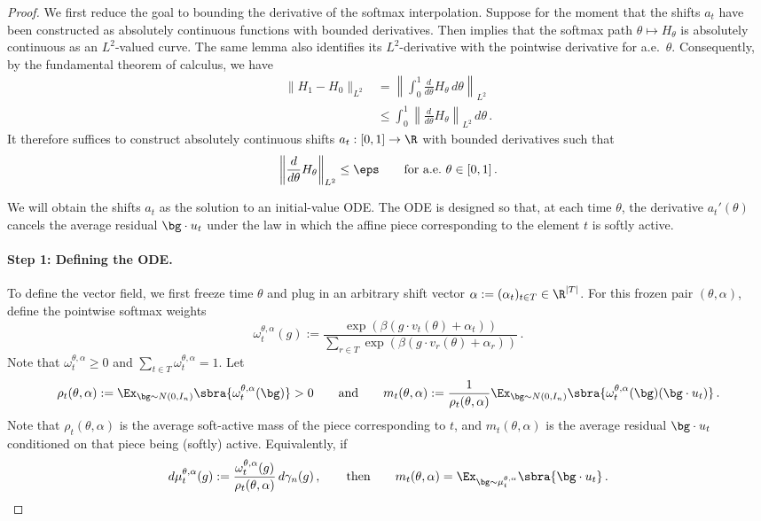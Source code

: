 \documentclass[11pt]{article}
\begin{document}
\begin{proof}
	We first reduce the goal to bounding the derivative of the softmax interpolation. 
	Suppose for the moment that the shifts $a_t$ have been constructed as absolutely continuous functions with bounded derivatives.
	Then  implies that the softmax path $\theta\mapsto H_\theta$ is absolutely continuous as an $L^2$-valued curve.
	The same lemma also identifies its $L^2$-derivative with the pointwise derivative for a.e.~$\theta$. 
	Consequently, by the fundamental theorem of calculus, we have 
	\begin{align}
		\|H_1-H_0\|_{L^2}
		&=
		\left\|
			\int_0^1 \frac{d}{d\theta} H_\theta \,d\theta
		\right\|_{L^2}
		\label{eq:main-proof-FTC} \\
		&\leq
		\int_0^1
		\left\|
			\frac{d}{d\theta} H_\theta
		\right\|_{L^2}
		\,d\theta\,.
		\nonumber
	\end{align}
	It therefore suffices to construct absolutely continuous shifts $a_t:[0,1]\to\R$ with bounded derivatives such that 
	\begin{equation}
		\label{eq:softmax-goal}
		\left\|
			\frac{d}{d\theta}H_\theta
		\right\|_{L^2}
		\leq
		\eps
		\qquad
		\text{for a.e.}~\theta\in[0,1]\,.
	\end{equation}
	
	We will obtain the shifts $a_t$ as the solution to an initial-value ODE.
	The ODE is designed so that, at each time $\theta$, the derivative $a_t'(\theta)$ cancels the average residual $\bg\cdot u_t$ under the law in which the affine piece corresponding to the element $t$ is softly active. 
	
	\paragraph{Step 1: Defining the ODE.} 	
	
	To define the vector field, we first freeze time $\theta$ and plug in an arbitrary shift vector $\alpha := (\alpha_t)_{t \in T} \in \R^{|T|}$.
	For this frozen pair $(\theta,\alpha)$, define the pointwise softmax weights 
	\[
		\omega_t^{\theta,\alpha}(g)
		:=
		\frac{
		\exp\left(\beta(g\cdot v_t(\theta)+\alpha_t)\right)
		}{
		\sum_{r\in T}
		\exp\left(\beta(g\cdot v_r(\theta)+\alpha_r)\right)
		}\,.
	\]
	Note that $\omega_t^{\theta,\alpha} \geq 0$ and $\sum_{t \in T} \omega_t^{\theta,\alpha} = 1$. 
	Let 
	\[
		\rho_t(\theta,\alpha) := \Ex_{\bg\sim N(0, I_n)}\sbra{\omega_t^{\theta,\alpha}(\bg)} > 0
		\qquad\text{and}\qquad 
		m_t(\theta,\alpha) := \frac{1}{\rho_t(\theta,\alpha)}\Ex_{\bg\sim N(0, I_n)}\sbra{\omega_t^{\theta,\alpha}(\bg)(\bg\cdot u_t)}\,.
	\]
	Note that $\rho_t(\theta,\alpha)$ is the average soft-active mass of the piece corresponding to $t$, and $m_t(\theta,\alpha)$ is the average residual $\bg\cdot u_t$ conditioned on that piece being (softly) active. 
	Equivalently, if
	\begin{equation} \label{eq:mu-def}
		d\mu_t^{\theta,\alpha}(g)
		:=
		\frac{\omega_t^{\theta,\alpha}(g)}{\rho_t(\theta,\alpha)}
		\,d\gamma_n(g)\,,
		\qquad\text{then}\qquad 
		m_t(\theta,\alpha)
		=
		\Ex_{\bg\sim\mu_t^{\theta,\alpha}}\sbra{\bg\cdot u_t}\,.
	\end{equation}
	

\end{proof}
\end{document}
